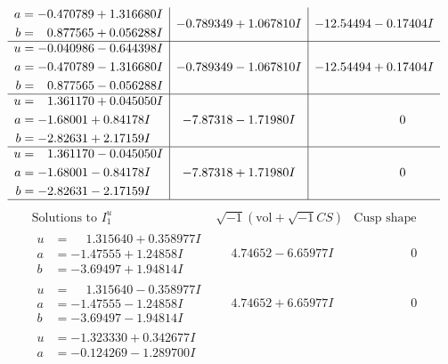 \documentclass[1p]{elsarticle_modified}
\theoremstyle{definition}
\newcommand{\I}{\sqrt{-1}}
\begin{document}
$$\begin{array}{c|c|c}
\begin{aligned}
a &= -0.470789 + 1.316680 I \\
b &= \phantom{-}0.877565 + 0.056288 I\end{aligned}
 & -0.789349 + 1.067810 I & -12.54494 - 0.17404 I \\ \hline\begin{aligned}
u &= -0.040986 - 0.644398 I \\
a &= -0.470789 - 1.316680 I \\
b &= \phantom{-}0.877565 - 0.056288 I\end{aligned}
 & -0.789349 - 1.067810 I & -12.54494 + 0.17404 I \\ \hline\begin{aligned}
u &= \phantom{-}1.361170 + 0.045050 I \\
a &= -1.68001 + 0.84178 I \\
b &= -2.82631 + 2.17159 I\end{aligned}
 & -7.87318 - 1.71980 I & \phantom{-0.000000 } 0 \\ \hline\begin{aligned}
u &= \phantom{-}1.361170 - 0.045050 I \\
a &= -1.68001 - 0.84178 I \\
b &= -2.82631 - 2.17159 I\end{aligned}
 & -7.87318 + 1.71980 I & \phantom{-0.000000 } 0\\
 \hline 
 \end{array}$$\newpage$$\begin{array}{c|c|c}  
\text{Solutions to }I^u_{1}& \I (\text{vol} + \sqrt{-1}CS) & \text{Cusp shape}\\
 \hline 
\begin{aligned}
u &= \phantom{-}1.315640 + 0.358977 I \\
a &= -1.47555 + 1.24858 I \\
b &= -3.69497 + 1.94814 I\end{aligned}
 & \phantom{-}4.74652 - 6.65977 I & \phantom{-0.000000 } 0 \\ \hline\begin{aligned}
u &= \phantom{-}1.315640 - 0.358977 I \\
a &= -1.47555 - 1.24858 I \\
b &= -3.69497 - 1.94814 I\end{aligned}
 & \phantom{-}4.74652 + 6.65977 I & \phantom{-0.000000 } 0 \\ \hline\begin{aligned}
u &= -1.323330 + 0.342677 I \\
a &= -0.124269 - 1.289700 I \\

\end{aligned}
\end{array}$$
\end{document}

